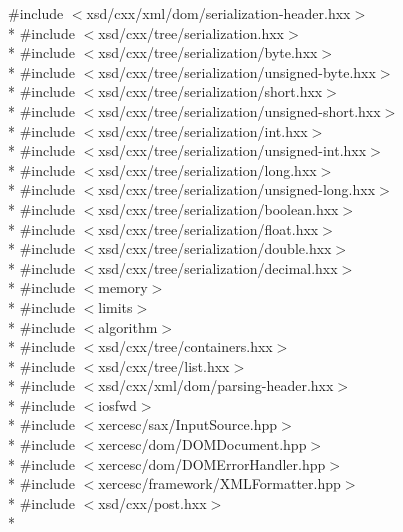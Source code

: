 {\ttfamily \#include $<$xsd/cxx/xml/dom/serialization-\/header.\-hxx$>$}\\*
{\ttfamily \#include $<$xsd/cxx/tree/serialization.\-hxx$>$}\\*
{\ttfamily \#include $<$xsd/cxx/tree/serialization/byte.\-hxx$>$}\\*
{\ttfamily \#include $<$xsd/cxx/tree/serialization/unsigned-\/byte.\-hxx$>$}\\*
{\ttfamily \#include $<$xsd/cxx/tree/serialization/short.\-hxx$>$}\\*
{\ttfamily \#include $<$xsd/cxx/tree/serialization/unsigned-\/short.\-hxx$>$}\\*
{\ttfamily \#include $<$xsd/cxx/tree/serialization/int.\-hxx$>$}\\*
{\ttfamily \#include $<$xsd/cxx/tree/serialization/unsigned-\/int.\-hxx$>$}\\*
{\ttfamily \#include $<$xsd/cxx/tree/serialization/long.\-hxx$>$}\\*
{\ttfamily \#include $<$xsd/cxx/tree/serialization/unsigned-\/long.\-hxx$>$}\\*
{\ttfamily \#include $<$xsd/cxx/tree/serialization/boolean.\-hxx$>$}\\*
{\ttfamily \#include $<$xsd/cxx/tree/serialization/float.\-hxx$>$}\\*
{\ttfamily \#include $<$xsd/cxx/tree/serialization/double.\-hxx$>$}\\*
{\ttfamily \#include $<$xsd/cxx/tree/serialization/decimal.\-hxx$>$}\\*
{\ttfamily \#include $<$memory$>$}\\*
{\ttfamily \#include $<$limits$>$}\\*
{\ttfamily \#include $<$algorithm$>$}\\*
{\ttfamily \#include $<$xsd/cxx/tree/containers.\-hxx$>$}\\*
{\ttfamily \#include $<$xsd/cxx/tree/list.\-hxx$>$}\\*
{\ttfamily \#include $<$xsd/cxx/xml/dom/parsing-\/header.\-hxx$>$}\\*
{\ttfamily \#include $<$iosfwd$>$}\\*
{\ttfamily \#include $<$xercesc/sax/\-Input\-Source.\-hpp$>$}\\*
{\ttfamily \#include $<$xercesc/dom/\-D\-O\-M\-Document.\-hpp$>$}\\*
{\ttfamily \#include $<$xercesc/dom/\-D\-O\-M\-Error\-Handler.\-hpp$>$}\\*
{\ttfamily \#include $<$xercesc/framework/\-X\-M\-L\-Formatter.\-hpp$>$}\\*
{\ttfamily \#include $<$xsd/cxx/post.\-hxx$>$}\\*
